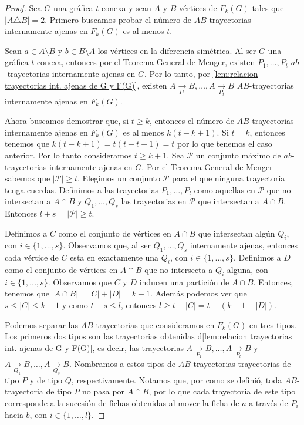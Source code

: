 \begin{proof}
    Sea $G$ una gr\'afica $t$-conexa y sean $A$ y $B$ v\'ertices de $F_{k}(G)$
    tales que $|A \triangle B| = 2$. Primero buscamos probar el n\'umero de
    $AB$-trayectorias internamente ajenas en $F_{k}(G)$ es al menos $t$. 
    
    Sean $a \in A \setminus B$ y $b \in B \setminus A$ los v\'ertices en la
    diferencia sim\'etrica. Al ser $G$ una gr\'afica $t$-conexa, entonces por el
    Teorema General de Menger, existen $P_{1}, \dots, P_{t}$ $ab$-trayectorias
    internamente ajenas en $G$. Por lo tanto, por \cref{lem:relacion
    trayectorias int. ajenas de G y F(G)}, existen $A \xrightarrow[P_1]{}  B,
    \dots, A \xrightarrow[P_t]{}  B$ $AB$-trayectorias internamente ajenas en
    $F_{k}(G)$. 

    Ahora buscamos demostrar que, si $t \geq k$, entonces el n\'umero de
    $AB$-trayectorias internamente ajenas en $F_{k}(G)$ es al menos $k(t- k
    +1)$. Si $t=k$, entonces tenemos que $k(t - k + 1) = t(t-t+1) = t$ por lo
    que tenemos el caso anterior. Por lo tanto consideramos  $t \geq k + 1$. Sea
    $\mathcal{P}$ un conjunto m\'aximo de $ab$-trayectorias internamente ajenas
    en $G$. Por el Teorema General de Menger sabemos que $|\mathcal{P}| \ge t$.
    Elegimos un conjunto $\mathcal{P}$ para el que ninguna trayectoria tenga
    cuerdas. Definimos a las trayectorias $P_{1}, \dots, P_{l}$ como aquellas en
    $\mathcal{P}$ que no intersectan a $A \cap B$ y $Q_{1}, \dots, Q_{s}$ las
    trayectorias en $\mathcal{P}$ que intersectan a $A \cap B$. Entonces $l + s
    = |\mathcal{P}| \ge t$.

    Definimos a $C$ como el conjunto de v\'ertices en $A \cap B$ que intersectan
    alg\'un $Q_i$, con $i \in \{1, \dots, s\}$. Observamos que, al ser $Q_1,
    \dots, Q_s$ internamente ajenas, entonces cada v\'ertice de $C$ esta en
    exactamente una $Q_i$, con $i \in \{1, \dots, s\}$. Definimos a $D$ como el
    conjunto de v\'ertices en $A \cap B$ que no intersecta a $Q_i$ alguna, con
    $i \in \{1, \dots, s\}$. Observamos que $C$ y $D$ inducen una partici\'on
    de $A \cap B$. Entonces, tenemos que $|A\cap B| = |C| + |D| = k-1$. Adem\'as
    podemos ver que $s \leq |C| \leq k-1$ y como $ t - s \leq l$, entonces $l
    \geq t -|C| = t- (k-1-|D|)$.

    Podemos separar las $AB$-trayectorias que consideramos en $F_{k}(G)$ en tres
    tipos. Los primeros dos tipos son las trayectorias obtenidas
    d\cref{lem:relacion trayectorias int. ajenas de G y F(G)}, es decir, las
    trayectorias $A \xrightarrow[P_1]{}  B, \dots, A \xrightarrow[P_l]{}  B$ y
    $A \xrightarrow[Q_1]{}  B, \dots, A \xrightarrow[Q_s]{}  B$. Nombramos a
    estos tipos de $AB$-trayectorias trayectorias de tipo $P$ y de tipo $Q$,
    respectivamente. Notamos que, por como se defini\'o, toda $AB$-trayectoria
    de tipo $P$ no pasa por $A\cap B$, por lo que cada trayectoria de este tipo
    corresponde a la sucesi\'on de fichas obtenidas al mover la ficha de $a$ a
    trav\'es de $P_i$ hacia $b$, con $i \in \{1, \dots, l\}$.
    

\end{proof}
